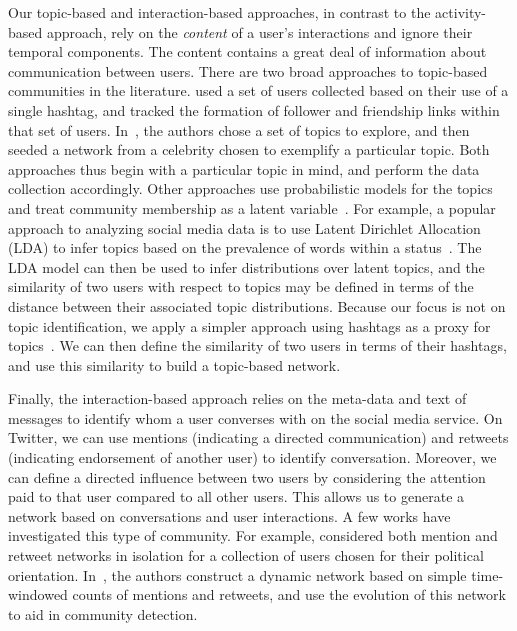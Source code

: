 Our topic-based and interaction-based approaches, in contrast to the activity-based approach, rely on the \emph{content} of a user's interactions and ignore their temporal components. The content contains a great deal of information about communication between users.
There are two broad approaches to topic-based communities in the literature. \cite{rossi2012conversation} used a set of users collected based on their use of a single hashtag, and tracked the formation of follower and friendship links within that set of users. In~\cite{lim2012following}, the authors chose a set of topics to explore, and then seeded a network from a celebrity chosen to exemplify a particular topic. Both approaches thus begin with a particular topic in mind, and perform the data collection accordingly. Other approaches use probabilistic models for the topics and treat community membership as a latent variable~\cite{yin2012latent}.
For example, a popular approach to analyzing social media data is to use Latent Dirichlet Allocation (LDA) to infer topics based on the prevalence of words within a status~\cite{zhao2011comparing,michelson2010discovering}. The LDA model can then be used to infer distributions over latent topics, and the similarity of two users with respect to topics may be defined in terms of the distance between their associated topic distributions. Because our focus is not on topic identification, we apply a simpler approach using hashtags as a proxy for topics~\cite{becker2011beyond,tsur2012s}. We can then define the similarity of two users in terms of their hashtags, and use this similarity to build a topic-based network.

Finally, the interaction-based approach relies on the meta-data and text of messages to identify whom a user converses with on the social media service. On Twitter, we can use mentions (indicating a directed communication) and retweets (indicating endorsement of another user) to identify conversation. Moreover, we can define a directed influence between two users by considering the attention paid to that user compared to all other users. This allows us to generate a network based on conversations and user interactions.
A few works have investigated this type of community. For example, \cite{conover2011political} considered both mention and retweet networks in isolation for a collection of users chosen for their political orientation. In~\cite{deitrick2013mutually}, the authors construct a dynamic network based on simple time-windowed counts of mentions and retweets, and use the evolution of this network to aid in community detection.

